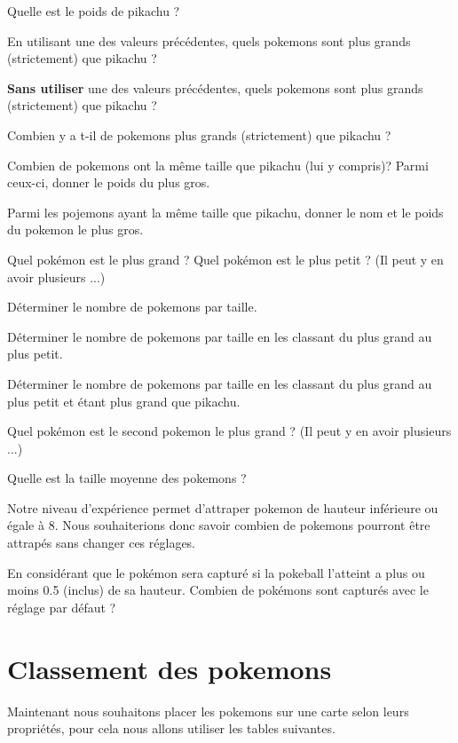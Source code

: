 \question{}
Quelle est le poids de pikachu ?

\question{}
En utilisant une des valeurs précédentes, quels pokemons sont plus grands (strictement) que pikachu ?


\question{}
\textbf{Sans utiliser} une des valeurs précédentes, quels pokemons sont plus grands (strictement) que pikachu ?


\question{}
Combien y a t-il de pokemons plus grands (strictement) que pikachu ?


\question{}
Combien de pokemons ont la même taille que pikachu (lui y compris)? Parmi ceux-ci, donner le poids du plus gros.

\question{}
Parmi les pojemons ayant la même taille que pikachu, donner le nom et le poids du pokemon le plus gros.

\question{}
Quel pokémon est le plus grand ? Quel pokémon est le plus petit ? (Il peut y en avoir plusieurs ...)

\question{}
Déterminer le nombre de pokemons par taille. 

\question{}
Déterminer le nombre de pokemons par taille en les classant du plus grand au plus petit. 


\question{}
Déterminer le nombre de pokemons par taille en les classant du plus grand au plus petit et étant plus grand que pikachu.


\question{}
Quel pokémon est le second pokemon le plus grand ? (Il peut y en avoir plusieurs ...)


\question{}
Quelle est la taille moyenne des pokemons ?



Notre niveau d'expérience permet d'attraper pokemon de hauteur inférieure ou égale à 8. 
Nous souhaiterions donc savoir combien de pokemons pourront être attrapés sans changer ces réglages.

\question{}
En considérant que le pokémon sera capturé si la pokeball l'atteint a plus ou moins 0.5 (inclus) de sa hauteur. Combien de pokémons sont capturés avec le réglage par défaut ?

\section*{Classement des pokemons}
Maintenant nous souhaitons placer les pokemons sur une carte selon leurs propriétés, pour cela nous allons utiliser les tables suivantes.


